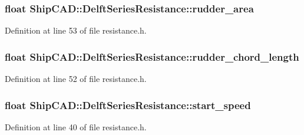 \subsubsection[{\texorpdfstring{rudder\+\_\+area}{rudder_area}}]{\setlength{\rightskip}{0pt plus 5cm}float Ship\+C\+A\+D\+::\+Delft\+Series\+Resistance\+::rudder\+\_\+area}\hypertarget{structShipCAD_1_1DelftSeriesResistance_a9737974d43a292c58a2e24f7c78c1ffb}{}\label{structShipCAD_1_1DelftSeriesResistance_a9737974d43a292c58a2e24f7c78c1ffb}


Definition at line 53 of file resistance.\+h.

\subsubsection[{\texorpdfstring{rudder\+\_\+chord\+\_\+length}{rudder_chord_length}}]{\setlength{\rightskip}{0pt plus 5cm}float Ship\+C\+A\+D\+::\+Delft\+Series\+Resistance\+::rudder\+\_\+chord\+\_\+length}\hypertarget{structShipCAD_1_1DelftSeriesResistance_a5a348a92e0ba99368c50f72c81a9b0ff}{}\label{structShipCAD_1_1DelftSeriesResistance_a5a348a92e0ba99368c50f72c81a9b0ff}


Definition at line 52 of file resistance.\+h.

\subsubsection[{\texorpdfstring{start\+\_\+speed}{start_speed}}]{\setlength{\rightskip}{0pt plus 5cm}float Ship\+C\+A\+D\+::\+Delft\+Series\+Resistance\+::start\+\_\+speed}\hypertarget{structShipCAD_1_1DelftSeriesResistance_a040e0d678c7dbc24c29b7da618b4094d}{}\label{structShipCAD_1_1DelftSeriesResistance_a040e0d678c7dbc24c29b7da618b4094d}


Definition at line 40 of file resistance.\+h.

